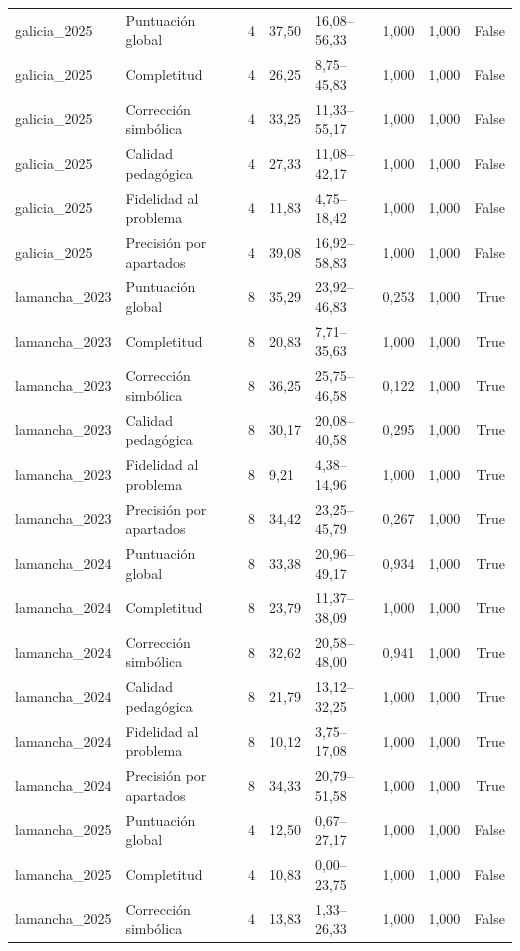 \begin{tabular}{llrllllr}
galicia\_2025 & Puntuación global & 4 & 37,50 & 16,08–56,33 & 1,000 & 1,000 & False \\
galicia\_2025 & Completitud & 4 & 26,25 & 8,75–45,83 & 1,000 & 1,000 & False \\
galicia\_2025 & Corrección simbólica & 4 & 33,25 & 11,33–55,17 & 1,000 & 1,000 & False \\
galicia\_2025 & Calidad pedagógica & 4 & 27,33 & 11,08–42,17 & 1,000 & 1,000 & False \\
galicia\_2025 & Fidelidad al problema & 4 & 11,83 & 4,75–18,42 & 1,000 & 1,000 & False \\
galicia\_2025 & Precisión por apartados & 4 & 39,08 & 16,92–58,83 & 1,000 & 1,000 & False \\
lamancha\_2023 & Puntuación global & 8 & 35,29 & 23,92–46,83 & 0,253 & 1,000 & True \\
lamancha\_2023 & Completitud & 8 & 20,83 & 7,71–35,63 & 1,000 & 1,000 & True \\
lamancha\_2023 & Corrección simbólica & 8 & 36,25 & 25,75–46,58 & 0,122 & 1,000 & True \\
lamancha\_2023 & Calidad pedagógica & 8 & 30,17 & 20,08–40,58 & 0,295 & 1,000 & True \\
lamancha\_2023 & Fidelidad al problema & 8 & 9,21 & 4,38–14,96 & 1,000 & 1,000 & True \\
lamancha\_2023 & Precisión por apartados & 8 & 34,42 & 23,25–45,79 & 0,267 & 1,000 & True \\
lamancha\_2024 & Puntuación global & 8 & 33,38 & 20,96–49,17 & 0,934 & 1,000 & True \\
lamancha\_2024 & Completitud & 8 & 23,79 & 11,37–38,09 & 1,000 & 1,000 & True \\
lamancha\_2024 & Corrección simbólica & 8 & 32,62 & 20,58–48,00 & 0,941 & 1,000 & True \\
lamancha\_2024 & Calidad pedagógica & 8 & 21,79 & 13,12–32,25 & 1,000 & 1,000 & True \\
lamancha\_2024 & Fidelidad al problema & 8 & 10,12 & 3,75–17,08 & 1,000 & 1,000 & True \\
lamancha\_2024 & Precisión por apartados & 8 & 34,33 & 20,79–51,58 & 1,000 & 1,000 & True \\
lamancha\_2025 & Puntuación global & 4 & 12,50 & 0,67–27,17 & 1,000 & 1,000 & False \\
lamancha\_2025 & Completitud & 4 & 10,83 & 0,00–23,75 & 1,000 & 1,000 & False \\
lamancha\_2025 & Corrección simbólica & 4 & 13,83 & 1,33–26,33 & 1,000 & 1,000 & False \\

\end{tabular}
